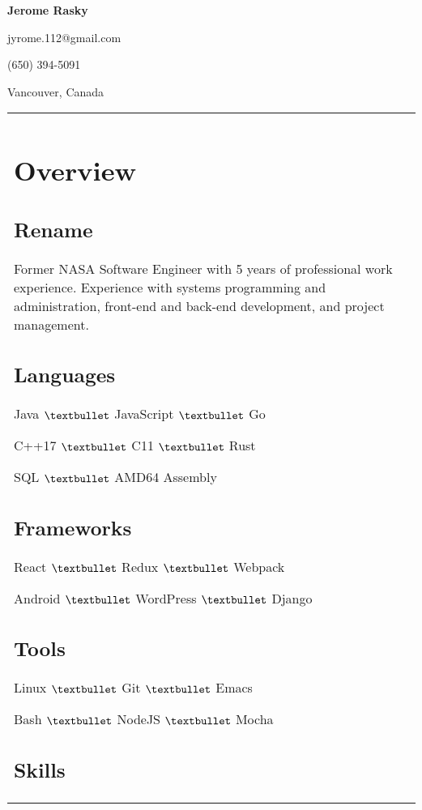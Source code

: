 \documentclass[letterpaper]{article}
\newlength{\leftcol}
\newlength{\rightcol}
\begin{document}
\bodyfont
\large
{}

{\fontsize{32pt}{32pt}\bfseries\headingfont Jerome Rasky}

\vspace*{.5\baselineskip}

jyrome.112@gmail.com

(650) 394-5091

Vancouver, Canada

\begin{tabularx}{\textwidth}{@{}p{\leftcol} p{\rightcol}}
\raggedright
\vspace*{1pt}
\section*{Overview}
\subsection*{Rename}

Former NASA Software Engineer with 5 years of professional work experience.
Experience with systems programming and administration, front-end and back-end
development, and project management.

\subsection*{Languages}

Java $\textbullet$ JavaScript $\textbullet$ Go

C++17 $\textbullet$ C11 $\textbullet$ Rust

SQL $\textbullet$ AMD64 Assembly

\subsection*{Frameworks}

React $\textbullet$ Redux $\textbullet$ Webpack

Android $\textbullet$ WordPress $\textbullet$ Django

\subsection*{Tools}

Linux $\textbullet$ Git $\textbullet$ Emacs

Bash $\textbullet$ NodeJS $\textbullet$ Mocha

\subsection*{Skills}


\end{tabularx}
\end{document}
